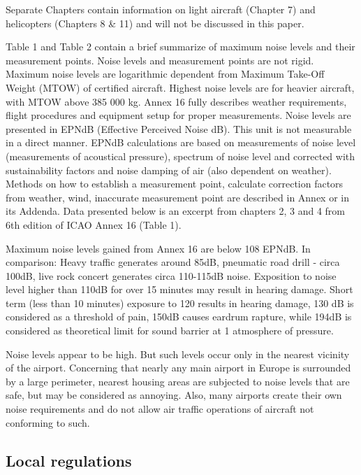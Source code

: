 Separate Chapters contain information on light aircraft (Chapter 7) and helicopters (Chapters 8 \& 11) and will not be discussed in this paper.

Table 1 and Table 2 contain a brief summarize of maximum noise levels and their measurement points. Noise levels and measurement points are not rigid. Maximum noise levels are logarithmic dependent from Maximum Take-Off Weight (MTOW) of certified aircraft. Highest noise levels are for heavier aircraft, with MTOW above 385 000 kg. Annex 16 fully describes weather requirements, flight procedures and equipment setup for proper measurements. Noise levels are presented in EPNdB (Effective Perceived Noise dB). This unit is not measurable in a direct manner. EPNdB calculations are based on measurements of noise level (measurements of acoustical pressure), spectrum of noise level and corrected with sustainability factors and noise damping of air (also dependent on weather). Methods on how to establish a measurement point, calculate correction factors from weather, wind, inaccurate measurement point are described in Annex or in its Addenda. Data presented below is an excerpt from chapters 2, 3 and 4 from 6th edition of ICAO Annex 16 (Table 1).

Maximum noise levels gained from Annex 16 are below 108 EPNdB. In comparison: Heavy traffic generates around 85dB, pneumatic road drill - circa 100dB, live rock concert generates circa 110-115dB noise. Exposition to noise level higher than 110dB for over 15 minutes may result in hearing damage. Short term (less than 10 minutes) exposure to 120 results in hearing damage, 130 dB is considered as a threshold of pain, 150dB causes eardrum rapture, while 194dB is considered as theoretical limit for sound barrier at 1 atmosphere of pressure.

Noise levels appear to be high. But such levels occur only in the nearest vicinity of the airport. Concerning that nearly any main airport in Europe is surrounded by a large perimeter, nearest housing areas are subjected to noise levels that are safe, but may be considered as annoying. Also, many airports create their own noise requirements and do not allow air traffic operations of aircraft not conforming to such.


\subsection{Local regulations}

